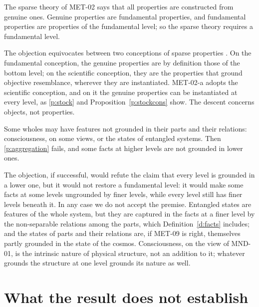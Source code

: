 \documentclass{situationist-preprint}
\begin{document}
\begin{objection}\label{o:props}
The sparse theory of MET-02 says that all properties are constructed from genuine ones. Genuine properties are fundamental properties, and fundamental properties are properties of the fundamental level; so the sparse theory requires a fundamental level.
\end{objection}

\begin{reply}
The objection equivocates between two conceptions of sparse properties \citep{Schaffer2004}. On the fundamental conception, the genuine properties are by definition those of the bottom level; on the scientific conception, they are the properties that ground objective resemblance, wherever they are instantiated. MET-02-a adopts the scientific conception, and on it the genuine properties can be instantiated at every level, as \ref{p:stock} and Proposition~\ref{p:stockcons} show. The descent concerns objects, not properties.
\end{reply}

\begin{objection}\label{o:emergence}
Some wholes may have features not grounded in their parts and their relations: consciousness, on some views, or the states of entangled systems. Then \ref{p:aggregation} fails, and some facts at higher levels are not grounded in lower ones.
\end{objection}

\begin{reply}
The objection, if successful, would refute the claim that every level is grounded in a lower one, but it would not restore a fundamental level: it would make some facts at some levels ungrounded by finer levels, while every level still has finer levels beneath it. In any case we do not accept the premise. Entangled states are features of the whole system, but they are captured in the facts at a finer level by the non-separable relations among the parts, which Definition~\ref{d:facts} includes; and the states of parts and their relations are, if MET-09 is right, themselves partly grounded in the state of the cosmos. Consciousness, on the view of MND-01, is the intrinsic nature of physical structure, not an addition to it; whatever grounds the structure at one level grounds its nature as well.
\end{reply}

\section{What the result does not establish}\label{s:limits}
\end{document}

